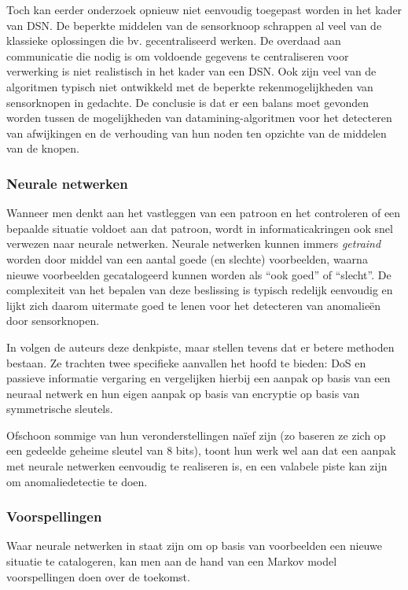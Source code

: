 Toch kan eerder onderzoek opnieuw niet eenvoudig toegepast worden in het kader
van DSN. De beperkte middelen van de sensorknoop schrappen al veel van de
klassieke oplossingen die bv. gecentraliseerd werken. De overdaad aan
communicatie die nodig is om voldoende gegevens te centraliseren voor
verwerking is niet realistisch in het kader van een DSN. Ook zijn veel van de
algoritmen typisch niet ontwikkeld met de beperkte rekenmogelijkheden van
sensorknopen in gedachte. De conclusie is dat er een balans moet gevonden
worden tussen de mogelijkheden van datamining-algoritmen voor het detecteren
van afwijkingen en de verhouding van hun noden ten opzichte van de middelen van
de knopen.

\subsubsection*{Neurale netwerken}
\label{subsubsection:neuralnetworks}

Wanneer men denkt aan het vastleggen van een patroon en het controleren of een
bepaalde situatie voldoet aan dat patroon, wordt in informaticakringen ook snel
verwezen naar neurale netwerken. Neurale netwerken kunnen immers
\emph{getraind} worden door middel van een aantal goede (en slechte)
voorbeelden, waarna nieuwe voorbeelden gecatalogeerd kunnen worden als ``ook
goed'' of ``slecht''. De complexiteit van het bepalen van deze beslissing is
typisch redelijk eenvoudig en lijkt zich daarom uitermate goed te lenen voor
het detecteren van anomalie\"en door sensorknopen.

In \citep{ramesh2012wireless} volgen de auteurs deze denkpiste, maar stellen
tevens dat er betere methoden bestaan. Ze trachten twee specifieke aanvallen
het hoofd te bieden: DoS en passieve informatie vergaring en vergelijken
hierbij een aanpak op basis van een neuraal netwerk en hun eigen aanpak op
basis van encryptie op basis van symmetrische sleutels.

Ofschoon sommige van hun veronderstellingen na\"ief zijn (zo baseren ze zich op
een gedeelde geheime sleutel van 8 bits), toont hun werk wel aan dat een aanpak
met neurale netwerken eenvoudig te realiseren is, en een valabele piste kan
zijn om anomaliedetectie te doen.

\subsubsection*{Voorspellingen}
\label{subsubsection:predictions}

Waar neurale netwerken in staat zijn om op basis van voorbeelden een nieuwe
situatie te catalogeren, kan men aan de hand van een Markov model
voorspellingen doen over de toekomst.

